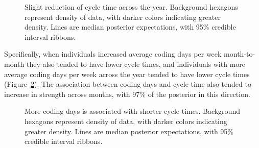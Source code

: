 \documentclass[
  sn-mathphys-ay,
]{sn-jnl}
\begin{document}
\begin{figure}


\caption[Slight reduction of cycle time across the
year]{\label{fig-month}Slight reduction of cycle time across the year.
Background hexagons represent density of data, with darker colors
indicating greater density. Lines are median posterior expectations,
with 95\% credible interval ribbons.}

\end{figure}%

Specifically, when individuals increased average coding days per week
month-to-month they also tended to have lower cycle times, and
individuals with more average coding days per week across the year
tended to have lower cycle times (Figure~\ref{fig-codingdays}). The
association between coding days and cycle time also tended to increase
in strength across months, with 97\% of the posterior in this direction.

\begin{figure}


\caption[More coding days is associated with shorter cycle
times]{\label{fig-codingdays}More coding days is associated with shorter
cycle times. Background hexagons represent density of data, with darker
colors indicating greater density. Lines are median posterior
expectations, with 95\% credible interval ribbons.}

\end{figure}%
\end{document}
